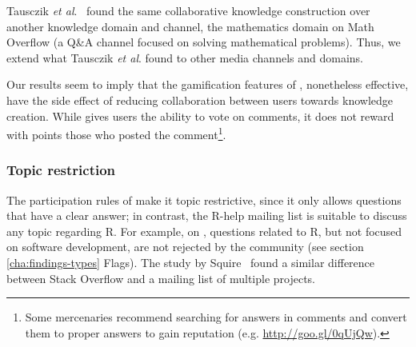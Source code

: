     Tausczik \textit{et al}.~\cite{Tausczik2014} found the same collaborative knowledge construction over another knowledge domain and channel, the mathematics domain on Math Overflow (a Q\&A channel focused on solving mathematical problems).
    Thus, we extend what Tausczik \textit{et al}. found to other media channels and domains.

    Our results seem to imply that the gamification features of \SO, nonetheless effective, have the side effect of reducing collaboration between users towards knowledge creation.
    While \SO gives users the ability to vote on comments, it does not reward with points those who posted the comment\footnote{Some \SO \textsf{mercenaries}
      recommend searching for answers in comments and convert them to proper answers to gain reputation (e.g. \url{http://goo.gl/0qUjQw}).}.

\subsubsection{Topic restriction}

The participation rules of \SO make it topic restrictive, since it only allows questions that have a clear answer; in contrast, the R-help mailing list is suitable to discuss
any topic regarding R. For example, on \RH, questions related to R, but not focused on software development, are not rejected by the community (see section
\ref{cha:findings-types} Flags).
The study by Squire~\cite{Squire2015a} found a similar difference between Stack Overflow and a mailing list of multiple projects.

